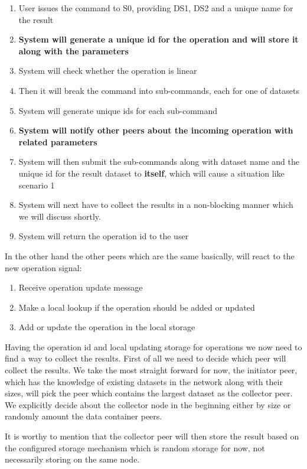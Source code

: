 \begin{enumerate}
\item User issues the command to S0, providing DS1, DS2 and a unique name for the result
\item \textbf{System will generate a unique id for the operation and will store it along with the parameters}
\item System will check whether the operation is linear
\item Then it will break the command into sub-commands, each for one of datasets
\item System will generate unique ids for each sub-command
\item \textbf{System will notify other peers about the incoming operation with related parameters}
\item System will then submit the sub-commands along with dataset name and the unique id for the result dataset
to \textbf{itself}, which will cause a situation like scenario 1
\item System will next have to collect the results in a non-blocking manner which we will discuss shortly.
\item System will return the operation id to the user
\end{enumerate}

In the other hand the other peers which are the same basically, will react to the new operation signal:

\begin{enumerate}
\item Receive operation update message
\item Make a local lookup if the operation should be added or updated
\item Add or update the operation in the local storage
\end{enumerate}

Having the operation id and local updating storage for operations we now need to find a way to collect the results.
First of all we need to decide which peer will collect the results. We take the most straight forward for now, the 
initiator peer, which has the knowledge of existing datasets in the network along with their sizes, will pick the 
peer which contains the largest dataset as the collector peer. We explicitly decide about the collector node in the
beginning either by size or randomly amount the data container peers.

It is worthy to mention that the collector peer will then store the result based on the configured storage mechanism 
which is random storage for now, not necessarily storing on the same node.

